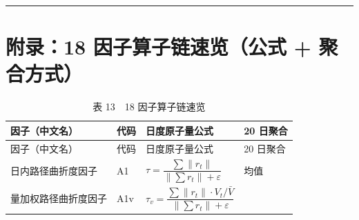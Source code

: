 \documentclass[UTF8,a4paper,zihao=-4,fontset=windows]{ctexart}
\begin{document}
\begin{center}\rule{0.5\linewidth}{0.5pt}\end{center}

\section{附录：18 因子算子链速览（公式 +
聚合方式）}\label{ux9644ux5f5518-ux56e0ux5b50ux7b97ux5b50ux94feux901fux89c8ux516cux5f0f-ux805aux5408ux65b9ux5f0f}

\begin{longtable}[]{@{}
  >{\raggedright\arraybackslash}p{}
  >{\raggedright\arraybackslash}p{}
  >{\raggedright\arraybackslash}p{}
  >{\raggedright\arraybackslash}p{}@{}}
\caption{表 13　18 因子算子链速览}\tabularnewline
\toprule\noalign{}
\begin{minipage}[b]{\linewidth}\raggedright
因子（中文名）
\end{minipage} & \begin{minipage}[b]{\linewidth}\raggedright
代码
\end{minipage} & \begin{minipage}[b]{\linewidth}\raggedright
日度原子量公式
\end{minipage} & \begin{minipage}[b]{\linewidth}\raggedright
20 日聚合
\end{minipage} \\
\midrule\noalign{}
\endfirsthead
\toprule\noalign{}
\begin{minipage}[b]{\linewidth}\raggedright
因子（中文名）
\end{minipage} & \begin{minipage}[b]{\linewidth}\raggedright
代码
\end{minipage} & \begin{minipage}[b]{\linewidth}\raggedright
日度原子量公式
\end{minipage} & \begin{minipage}[b]{\linewidth}\raggedright
20 日聚合
\end{minipage} \\
\midrule\noalign{}
\endhead
\bottomrule\noalign{}
\endlastfoot
日内路径曲折度因子 & A1 &
\(\tau=\dfrac{\sum \lVert r_t\rVert}{\lVert\sum r_t\rVert+\varepsilon}\)
& 均值 \\
量加权路径曲折度因子 & A1v &
\(\tau_v=\dfrac{\sum \lVert r_t\rVert\cdot V_t/\bar V}{\lVert\sum r_t\rVert+\varepsilon}\)

\end{longtable}
\end{document}
